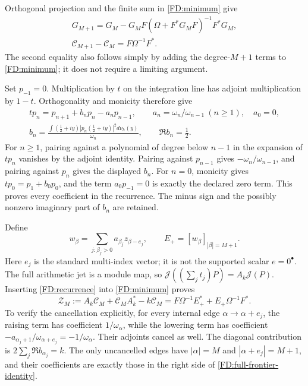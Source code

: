 Orthogonal projection and the finite sum in \eqref{FD:minimum} give
\begin{equation}
\begin{gathered}
G_{M+1}=G_M-G_MF(\Omega+F^*G_MF)^{-1}F^*G_M,\\
\mathcal C_{M+1}-\mathcal C_M=F\Omega^{-1}F^*.
\end{gathered}
\tag{FD.15}\label{FD:full-update}
\end{equation}
The second equality also follows simply by adding the degree-\(M+1\)
terms to \eqref{FD:minimum}; it does not require a limiting argument.

Set \(p_{-1}=0\).  Multiplication by \(t\) on the integration line has adjoint multiplication
by \(1-t\).  Orthogonality and monicity therefore give
\begin{equation}
\begin{gathered}
tp_n=p_{n+1}+b_np_n-a_np_{n-1},\qquad
a_n=\omega_n/\omega_{n-1}\ (n\ge1),\quad a_0=0,\\
b_n=\frac{\int(\tfrac12+iy)|p_n(\tfrac12+iy)|^2d\nu_h(y)}{\omega_n},
\qquad \Re b_n=\tfrac12.
\end{gathered}
\tag{FD.16}\label{FD:recurrence}
\end{equation}
For \(n\ge1\), pairing against a polynomial of degree below \(n-1\)
in the expansion of \(tp_n\)
vanishes by the adjoint identity.  Pairing against \(p_{n-1}\) gives
\(-\omega_n/\omega_{n-1}\), and pairing against \(p_n\) gives the
displayed \(b_n\).  For \(n=0\), monicity gives
\(tp_0=p_1+b_0p_0\), and the term \(a_0p_{-1}=0\) is exactly the
declared zero term.  This proves every coefficient in the recurrence.
The minus sign and the possibly nonzero imaginary part of \(b_n\) are
retained.

Define
\begin{equation}
w_\beta=\sum_{j:\beta_j>0}a_{\beta_j}z_{\beta-e_j},\qquad
E_+=[w_\beta]_{|\beta|=M+1}.
\tag{FD.17}\label{FD:lowering-jets}
\end{equation}
Here \(e_j\) is the standard multi-index vector; it is not the supported
scalar \(e=0^\bullet\).  The full arithmetic jet is a module map, so
\(\mathcal J((\sum_jt_j)P)=A_k\mathcal J(P)\).  Inserting
\eqref{FD:recurrence} into \eqref{FD:minimum} proves
\begin{equation}
\mathcal Z_M:=A_k\mathcal C_M+\mathcal C_MA_k^*-k\mathcal C_M
=F\Omega^{-1}E_+^*+E_+\Omega^{-1}F^*.
\tag{FD.18}\label{FD:full-frontier-identity}
\end{equation}
To verify the cancellation explicitly, for every internal edge
\(\alpha\to\alpha+e_j\), the raising term has coefficient
\(1/\omega_\alpha\), while the lowering term has coefficient
\(-a_{\alpha_j+1}/\omega_{\alpha+e_j}=-1/\omega_\alpha\).
Their adjoints cancel as well.  The diagonal contribution is
\(2\sum_j\Re b_{\alpha_j}=k\).  The only uncancelled edges have
\(|\alpha|=M\) and \(|\alpha+e_j|=M+1\), and their coefficients are
exactly those in the right side of \eqref{FD:full-frontier-identity}.

